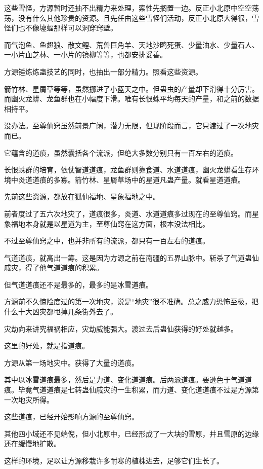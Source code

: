 \begin{this_body}
这些雪怪，方源暂时还抽不出精力来处理，索性先搁置一边。反正小北原中空空荡荡，没有什么其他珍贵的资源。且先任由这些雪怪们活动，反正小北原大得很，雪怪们也不像墟蝠那样可以洞穿窍壁。

而气泡鱼、鱼翅狼、散文鲤、荒兽巨角羊、天地沙鸥死蛋、少量油水、少量石人、一小片血芝林、一小片的镜柳等等，也都安排妥善。

方源锤炼炼蛊技艺的同时，也抽出一部分精力。照看这些资源。

箭竹林、星屑草等等，虽然挪进了小蓝天之中。但蛊虫的产量却下滑得十分厉害。而幽火龙蟒、龙鱼群也在小幅度下滑。唯有长恨蛛平均每天的产量，和之前的数据相持平。

没办法。至尊仙窍虽然前景广阔，潜力无限，但现阶段而言，它只渡过了一次地灾而已。

它蕴含的道痕，虽然囊括各个流派，但绝大多数分别只有一百左右的道痕。

长恨蛛群的培育，依仗智道道痕，龙鱼群则靠食道、水道道痕，幽火龙蟒看生存环境中炎道道痕的多寡。箭竹林、星屑草场中的星道凡蛊产量。就看星道道痕。

先前这些资源，都放在狐仙福地、星象福地之中。

前者度过了五六次地灾了，道痕很多，炎道、水道道痕多过现在的至尊仙窍。而星象福地本身就是以星道为主，至尊仙窍在这方面，根本没法相比。

不过至尊仙窍之中，也并非所有的流派，都只有一百左右的道痕。

气道道痕，就高出一筹。这是因为方源之前在南疆的五界山脉中。斩杀了气道蛊仙戚灾，得了他气道道痕的积累。

但气道道痕还不是最多的，最多的是冰雪道痕。

方源前不久惊险度过的第一次地灾，说是“地灾”很不准确。总之威力恐怖至极，把什么十大凶灾都甩掉几条街外去了。

灾劫向来讲究福祸相应，灾劫威能强大。渡过去后蛊仙获得的好处就越多。

这里的好处，就是指道痕。

方源从第一场地灾中。获得了大量的道痕。

其中以冰雪道痕最多，然后是力道、变化道道痕。后两派道痕。要逊色于气道道痕。毕竟气道道痕是七转蛊仙戚灾的一生积累，而力道、变化道道痕不过是方源第一次地灾所得。

这些道痕，已经开始影响方源的至尊仙窍。

其他四小域还不见端倪，但小北原中，已经形成了一大块的雪原，并且雪原的边缘还在缓慢地扩散。

这样的环境，足以让方源移栽许多耐寒的植株进去，足够它们生长了。


\end{this_body}
